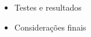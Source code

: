 \documentclass[10pt]{beamer}
\begin{document}
\begin{frame}
\begin{itemize}
    \item Testes e resultados

    \item Considerações finais

  \end{itemize}

\end{frame}
\end{document}
